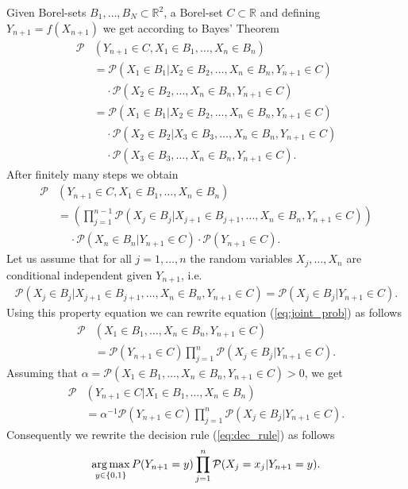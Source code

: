 	Given Borel-sets $B_{1}, \ldots, B_{N}\subset\mathbb{R}^{2}$, a Borel-set $C\subset\mathbb{R}$ and defining $Y_{n + 1} = f(X_{n + 1})$ 
	we get according to Bayes' Theorem
	\begin{align*}
	  \mathcal{P}&(Y_{n + 1}\in C, X_{1}\in B_{1}, \ldots, X_{n}\in B_{n}) \\
			&= \mathcal{P}(X_{1}\in B_{1}|X_{2}\in B_{2}, \ldots, X_{n}\in B_{n}, Y_{n + 1}\in C) \\ 
						& ~~~~~ \cdot	\mathcal{P}(X_{2}\in B_{2}, \ldots, X_{n}\in B_{n}, Y_{n + 1}\in C) \\
			&= \mathcal{P}(X_{1}\in B_{1}|X_{2}\in B_{2}, \ldots, X_{n}\in B_{n}, Y_{n + 1}\in C) \\
						& ~~~~~ \cdot \mathcal{P}(X_{2}\in B_{2}|X_{3}\in B_{3}, \ldots, X_{n}\in B_{n}, Y_{n + 1}\in C) \\
						& ~~~~~ \cdot \mathcal{P}(X_{3}\in B_{3}, \ldots, X_{n}\in B_{n}, Y_{n + 1}\in C).
	\end{align*}
  After finitely many steps we obtain
	\begin{align}\label{eq:joint_prob}
	  \mathcal{P}&(Y_{n + 1}\in C, X_{1}\in B_{1}, \ldots, X_{n}\in B_{n}) \nonumber\\
			&=(\prod_{j = 1}^{n - 1}\mathcal{P}(X_{j}\in B_{j}|X_{j + 1}\in B_{j + 1}, \ldots, X_{n}\in B_{n}, Y_{n + 1}\in C)) \nonumber\\
						& ~~~~~	\cdot\mathcal{P}(X_{n}\in B_{n}|Y_{n + 1}\in C)\cdot\mathcal{P}(Y_{n + 1}\in C).
	\end{align}
  Let us assume that for all $j = 1, \ldots, n$ the random variables $X_{j}, \ldots, X_{n}$ are conditional independent given 
	$Y_{n + 1}$, i.e.
	\begin{align*}
		\mathcal{P}(X_{j}\in B_{j} | X_{j + 1}\in B_{j + 1}, \ldots, X_{n}\in B_{n}, Y_{n + 1}\in C) = \mathcal{P}(X_{j}\in B_{j} | Y_{n + 1}\in C).
	\end{align*}
	Using this property equation we can rewrite equation (\ref{eq:joint_prob}) as follows
	\begin{align*}
		\mathcal{P}&(X_{1}\in B_{1}, \ldots, X_{n}\in B_{n}, Y_{n + 1}\in C) \\
			&= \mathcal{P}(Y_{n + 1}\in C)\prod_{j = 1}^{n}\mathcal{P}(X_{j}\in B_{j}|Y_{n + 1}\in C).
	\end{align*}
	Assuming that $\alpha=\mathcal{P}(X_{1}\in B_{1}, \ldots, X_{n}\in B_{n}, Y_{n + 1}\in C) > 0$, we get
	\begin{align*}
		\mathcal{P}&(Y_{n + 1}\in C|X_{1}\in B_{1}, \ldots, X_{n}\in B_{n}) \\
			&= \alpha^{-1}\mathcal{P}(Y_{n + 1}\in C)\prod_{j = 1}^{n}\mathcal{P}(X_{j}\in B_{j}|Y_{n + 1}\in C).
	\end{align*}
  Consequently we rewrite the decision rule (\ref{eq:dec_rule}) as follows
	\begin{align}
		\operatorname*{arg\,max}_{y\in\{0, 1\}} P(Y_{n + 1} = y) \prod_{j = 1}^{n}\mathcal{P}(X_{j}=x_{j}|Y_{n + 1}=y).
	\end{align}
	
	
	
	

